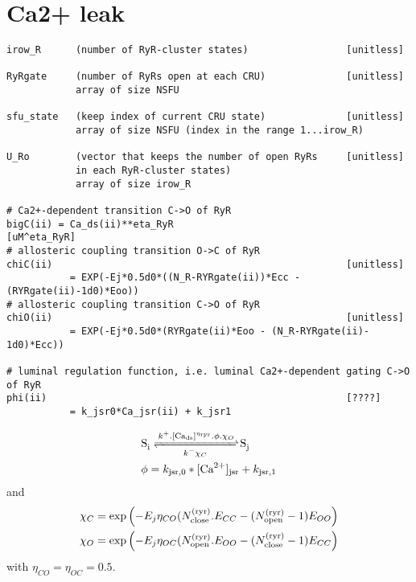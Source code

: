 \chapter{Ca2+ leak }
\label{sec:ca2+-leak-}

\begin{verbatim}
irow_R      (number of RyR-cluster states)                 [unitless]

RyRgate     (number of RyRs open at each CRU)              [unitless]
            array of size NSFU

sfu_state   (keep index of current CRU state)              [unitless]
            array of size NSFU (index in the range 1...irow_R)

U_Ro        (vector that keeps the number of open RyRs     [unitless]
            in each RyR-cluster states)
            array of size irow_R

# Ca2+-dependent transition C->O of RyR
bigC(ii) = Ca_ds(ii)**eta_RyR                              [uM^eta_RyR]
# allosteric coupling transition O->C of RyR
chiC(ii)                                                   [unitless]
           = EXP(-Ej*0.5d0*((N_R-RYRgate(ii))*Ecc - (RYRgate(ii)-1d0)*Eoo))
# allosteric coupling transition C->O of RyR
chiO(ii)                                                   [unitless]
           = EXP(-Ej*0.5d0*(RYRgate(ii)*Eoo - (N_R-RYRgate(ii)- 1d0)*Ecc))

# luminal regulation function, i.e. luminal Ca2+-dependent gating C->O of RyR
phi(ii)                                                    [????]
           = k_jsr0*Ca_jsr(ii) + k_jsr1
\end{verbatim}

\begin{equation}
  \label{eq:18}
  \begin{split}
    &\cee{S_i <=>[k^+.[\ca_\ds\mathcal{]}^{\eta_\ryr}.\phi.\chi_O][k^-\chi_C]
    S_j}
    \\
    &\phi = k_{\jsr,0} * [\Ca]_\jsr + k_{\jsr,1}    
  \end{split}
\end{equation}
and
\begin{equation}
  \label{eq:24}
  \begin{split}
      \chi_C = \exp\left( -E_j\eta_{CO} (N_{\text{close}}^{(\text{ryr})}.E_{CC} - (N_{\text{open}}^{(\text{ryr})}-1)E_{OO}\right) \\
      \chi_O =  \exp\left( -E_j\eta_{OC} (N_{\text{open}}^{(\text{ryr})}.E_{OO} - (N_{\text{close}}^{(\text{ryr})}-1)E_{CC}\right) 
  \end{split}
\end{equation}
with $\eta_{CO} =\eta_{OC} = 0.5$.

